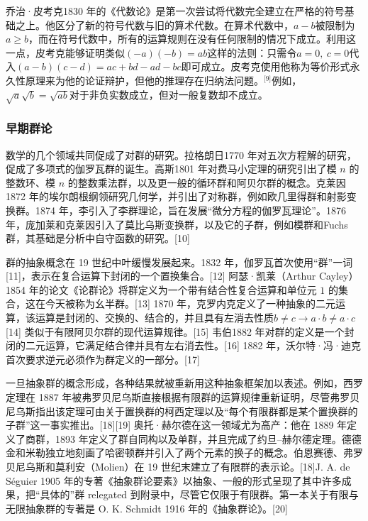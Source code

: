 乔治·皮考克1830 年的《代数论》是第一次尝试将代数完全建立在严格的符号基础之上。他区分了新的符号代数与旧的算术代数。在算术代数中，$a - b$被限制为$a \geq b$，而在符号代数中，所有的运算规则在没有任何限制的情况下成立。利用这一点，皮考克能够证明类似$(-a)(-b) = ab$这样的法则：只需令$a = 0,\ c = 0$代入$(a - b)(c - d) = ac + bd - ad - bc$即可成立。皮考克使用他称为等价形式永久性原理来为他的论证辩护，但他的推理存在归纳法问题。\(^\text{[9]}\)例如，$\sqrt{a}\sqrt{b} = \sqrt{ab}$对于非负实数成立，但对一般复数却不成立。
\subsubsection{早期群论}
数学的几个领域共同促成了对群的研究。拉格朗日1770 年对五次方程解的研究，促成了多项式的伽罗瓦群的诞生。高斯1801 年对费马小定理的研究引出了模 $n$ 的整数环、模 $n$ 的整数乘法群，以及更一般的循环群和阿贝尔群的概念。克莱因1872 年的埃尔朗根纲领研究几何学，并引出了对称群，例如欧几里得群和射影变换群。1874 年，李引入了李群理论，旨在发展“微分方程的伽罗瓦理论”。1876 年，庞加莱和克莱因引入了莫比乌斯变换群，以及它的子群，例如模群和Fuchs 群，其基础是分析中自守函数的研究。[10]

群的抽象概念在 19 世纪中叶缓慢发展起来。1832 年，伽罗瓦首次使用“群”一词[11]，表示在复合运算下封闭的一个置换集合。[12] 阿瑟·凯莱（Arthur Cayley）1854 年的论文《论群论》将群定义为一个带有结合性复合运算和单位元 $1$ 的集合，这在今天被称为幺半群。[13] 1870 年，克罗内克定义了一种抽象的二元运算，该运算是封闭的、交换的、结合的，并且具有左消去性质$b \neq c \to a \cdot b \neq a \cdot c$[14] 类似于有限阿贝尔群的现代运算规律。[15] 韦伯1882 年对群的定义是一个封闭的二元运算，它满足结合律并具有左右消去性。[16] 1882 年，沃尔特·冯·迪克首次要求逆元必须作为群定义的一部分。[17]

一旦抽象群的概念形成，各种结果就被重新用这种抽象框架加以表述。例如，西罗定理在 1887 年被弗罗贝尼乌斯直接根据有限群的运算规律重新证明，尽管弗罗贝尼乌斯指出该定理可由关于置换群的柯西定理以及“每个有限群都是某个置换群的子群”这一事实推出。[18][19] 奥托·赫尔德在这一领域尤为高产：他在 1889 年定义了商群，1893 年定义了群自同构以及单群，并且完成了约旦–赫尔德定理。德德金和米勒独立地刻画了哈密顿群并引入了两个元素的换子的概念。伯恩赛德、弗罗贝尼乌斯和莫利安（Molien）在 19 世纪末建立了有限群的表示论。[18]J. A. de Séguier 1905 年的专著《抽象群论要素》以抽象、一般的形式呈现了其中许多成果，把“具体的”群 relegated 到附录中，尽管它仅限于有限群。第一本关于有限与无限抽象群的专著是 O. K. Schmidt 1916 年的《抽象群论》。[20]
